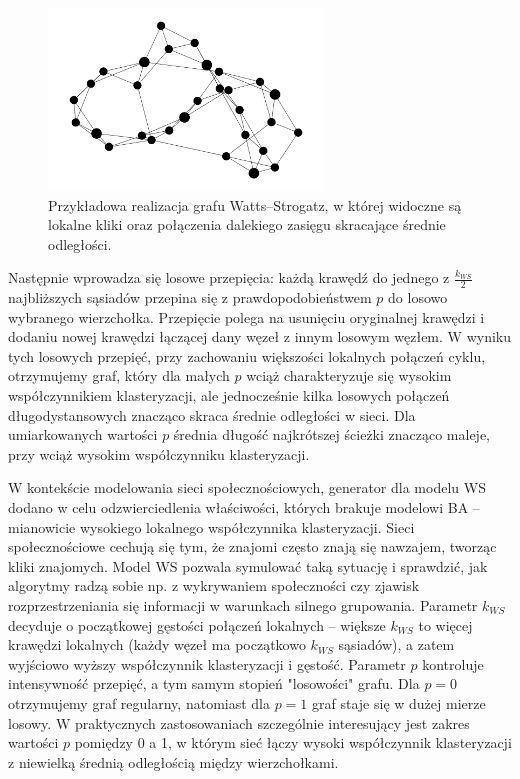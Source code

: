 \begin{figure}[h]
    \centering
    \includegraphics[width=0.65\textwidth]{assets/test_data/smallworld.png}
    \caption{Przykładowa realizacja grafu Watts--Strogatz, w której widoczne są lokalne kliki oraz połączenia dalekiego zasięgu skracające średnie odległości.}
    \label{fig:WS}
\end{figure}

Następnie wprowadza się losowe przepięcia: każdą krawędź do jednego z $\tfrac{k_{WS}}{2}$ najbliższych sąsiadów przepina się z prawdopodobieństwem $p$ do losowo wybranego wierzchołka. Przepięcie polega na usunięciu oryginalnej krawędzi i dodaniu nowej krawędzi łączącej dany węzeł z innym losowym węzłem. W wyniku tych losowych przepięć, przy zachowaniu większości lokalnych połączeń cyklu, otrzymujemy graf, który dla małych $p$ wciąż charakteryzuje się wysokim współczynnikiem klasteryzacji, ale jednocześnie kilka losowych połączeń długodystansowych znacząco skraca średnie odległości w sieci.
Dla umiarkowanych wartości $p$ średnia długość najkrótszej ścieżki znacząco maleje, przy wciąż wysokim współczynniku klasteryzacji.

W kontekście modelowania sieci społecznościowych, generator dla modelu WS dodano w celu odzwierciedlenia właściwości, których brakuje modelowi BA -- mianowicie wysokiego lokalnego współczynnika klasteryzacji. Sieci społecznościowe cechują się tym, że znajomi często znają się nawzajem, tworząc kliki znajomych. Model WS pozwala symulować taką sytuację i sprawdzić, jak algorytmy radzą sobie np. z wykrywaniem społeczności czy zjawisk rozprzestrzeniania się informacji w warunkach silnego grupowania. Parametr $k_{WS}$ decyduje o początkowej gęstości połączeń lokalnych -- większe $k_{WS}$ to więcej krawędzi lokalnych (każdy węzeł ma początkowo $k_{WS}$ sąsiadów), a zatem wyjściowo wyższy współczynnik klasteryzacji i gęstość. Parametr $p$ kontroluje intensywność przepięć, a tym samym stopień "losowości" grafu.
Dla $p=0$ otrzymujemy graf regularny, natomiast dla $p=1$ graf staje się w dużej mierze losowy.
W praktycznych zastosowaniach szczególnie interesujący jest zakres wartości $p$ pomiędzy 0 a 1, w którym sieć łączy wysoki współczynnik klasteryzacji z niewielką średnią odległością między wierzchołkami.


